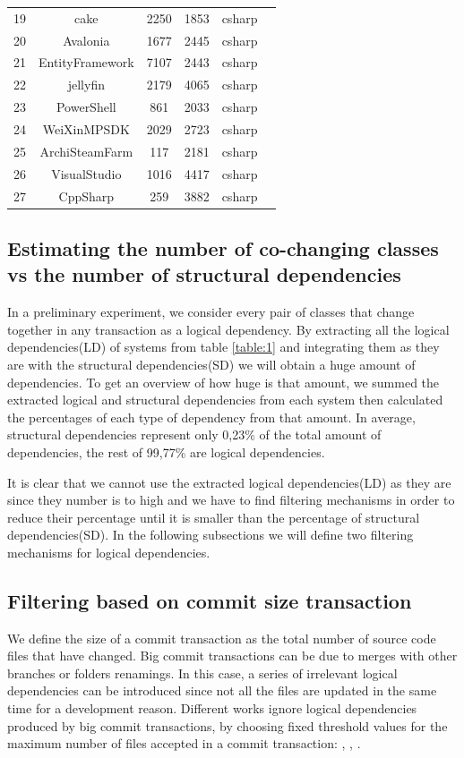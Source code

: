 \documentclass[conference]{IEEEtran}
\begin{document}
\begin{table}[!h]
\begin{tabular}{|c|c|c|c|c|c|}
19	&	cake	&	2250	&	1853	&	csharp	\\
20	&	Avalonia	&	1677	&	2445	&	csharp	\\
21	&	EntityFramework	&	7107	&	2443	&	csharp	\\
22	&	jellyfin	&	2179	&	4065	&	csharp	\\
23	&	PowerShell	&	861	&	2033	&	csharp	\\
24	&	WeiXinMPSDK	&	2029	&	2723	&	csharp	\\
25	&	ArchiSteamFarm	&	117	&	2181	&	csharp	\\
26	&	VisualStudio	&	1016	&	4417	&	csharp	\\
27	&	CppSharp	&	259	&	3882	&	csharp	\\
\hline
\end{tabular}
\end{table}

\subsection{Estimating the number of co-changing classes vs the number of structural dependencies}

In a preliminary experiment, we consider every pair of classes that change together in any transaction  as a logical dependency. By extracting all the logical dependencies(LD) of systems from table \ref{table:1} and integrating them as they are with the structural dependencies(SD) we will obtain a huge amount of dependencies. 
To get an overview of how huge is that amount, we summed the extracted logical and structural dependencies from each system then calculated the percentages of each type of dependency from that amount. In average, structural dependencies represent only 0,23\% of the total amount of dependencies, the rest of 99,77\% are logical dependencies.


It is clear that we cannot use the extracted logical dependencies(LD) as they are since they number is to high and we have to find filtering mechanisms in order to reduce their percentage until it is smaller than the percentage of structural dependencies(SD).
In the following subsections we will define two filtering mechanisms for logical dependencies.

\subsection{Filtering based on commit size transaction}

We define the size of a commit transaction as the total number of source code files that have changed. Big commit transactions can be due to merges with other branches or folders renamings. In this case, a series of irrelevant logical dependencies can be introduced since not all the files are updated in the same time for a development reason. Different works ignore logical dependencies produced by big commit transactions, by choosing fixed threshold values for the maximum number of files accepted in a commit transaction: \cite{DBLP:journals/jss/AjienkaC17}, \cite{DBLP:journals/ese/AjienkaCC18}, \cite{Beck:2011:CMC:2025113.2025162}.
\end{document}

